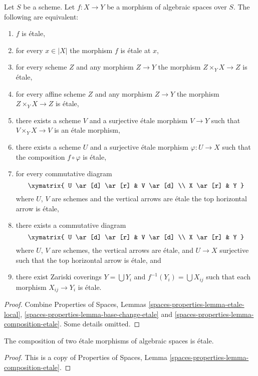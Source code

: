 \begin{lemma}
\label{lemma-etale-local}
Let $S$ be a scheme.
Let $f : X \to Y$ be a morphism of algebraic spaces over $S$.
The following are equivalent:
\begin{enumerate}
\item $f$ is \'etale,
\item for every $x \in |X|$ the morphism $f$ is \'etale at $x$,
\item for every scheme $Z$ and any morphism $Z \to Y$ the morphism
$Z \times_Y X \to Z$ is \'etale,
\item for every affine scheme $Z$ and any morphism
$Z \to Y$ the morphism $Z \times_Y X \to Z$ is \'etale,
\item there exists a scheme $V$ and a surjective \'etale morphism
$V \to Y$ such that $V \times_Y X \to V$ is an \'etale morphism,
\item there exists a scheme $U$ and a surjective \'etale morphism
$\varphi : U \to X$ such that the composition $f \circ \varphi$
is \'etale,
\item for every commutative diagram
$$
\xymatrix{
U \ar[d] \ar[r] & V \ar[d] \\
X \ar[r] & Y
}
$$
where $U$, $V$ are schemes and the vertical arrows are \'etale
the top horizontal arrow is \'etale,
\item there exists a commutative diagram
$$
\xymatrix{
U \ar[d] \ar[r] & V \ar[d] \\
X \ar[r] & Y
}
$$
where $U$, $V$ are schemes, the vertical arrows are \'etale, and
$U \to X$ surjective such that the top horizontal arrow is \'etale, and
\item there exist Zariski coverings $Y = \bigcup Y_i$ and
$f^{-1}(Y_i) = \bigcup X_{ij}$ such that each morphism
$X_{ij} \to Y_i$ is \'etale.
\end{enumerate}
\end{lemma}

\begin{proof}
Combine
Properties of Spaces, Lemmas
\ref{spaces-properties-lemma-etale-local},
\ref{spaces-properties-lemma-base-change-etale} and
\ref{spaces-properties-lemma-composition-etale}.
Some details omitted.
\end{proof}

\begin{lemma}
\label{lemma-composition-etale}
The composition of two \'etale morphisms of algebraic spaces
is \'etale.
\end{lemma}

\begin{proof}
This is a copy of
Properties of Spaces, Lemma \ref{spaces-properties-lemma-composition-etale}.
\end{proof}

